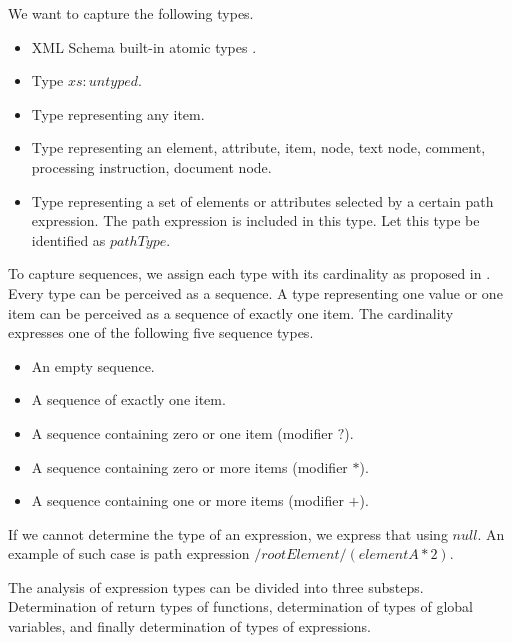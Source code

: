 
We want to capture the following types.

\begin{itemize}
\item XML Schema built-in atomic types .
\item Type $xs:untyped$. 
\item Type representing any item. 
\item Type representing an element, attribute, item, node, text node, comment, processing instruction, document node.
\item Type representing a set of elements or attributes selected by a certain path expression. The path expression is included in this type. Let this type be identified as $pathType$.
\end{itemize}


To capture sequences, we assign each type with its cardinality as proposed in . Every type can be perceived as a sequence. A type representing one value or one item can be perceived as a sequence of exactly one item. The cardinality expresses one of the following five sequence types.

\begin{itemize}
\item An empty sequence.
\item A sequence of exactly one item.
\item A sequence containing zero or one item (modifier $?$).
\item A sequence containing zero or more items (modifier $*$).
\item A sequence containing one or more items (modifier $+$).
\end{itemize}

If we cannot determine the type of an expression, we express that using $null$. An example of such case is path expression $/rootElement/(elementA * 2)$. 

The analysis of expression types can be divided into three substeps. Determination of return types of functions, determination of types of global variables, and finally determination of types of expressions.

